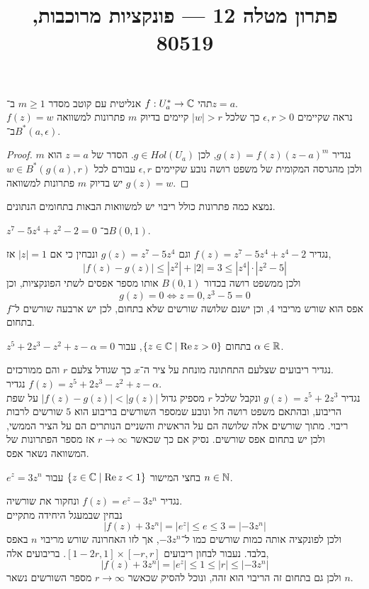 
\title{פתרון מטלה 12 --- פונקציות מרוכבות, 80519}


\maketitle
\maketitleprint{}

\question{}
תהי $f : U_a^* \to \mathbb{C}$ אנליטית עם קוטב מסדר $m \ge 1$ ב־$z = a$. \\
נראה שקיימים $\epsilon, r > 0$ כך שלכל $|w| > r$ קיימים בדיוק $m$ פתרונות למשוואה $f(z) = w$ ב־$B^*(a, \epsilon)$.
\begin{proof}
	נגדיר $g(z) = f(z) {(z - a)}^m$, לכן $g \in Hol(U_a)$.
	הסדר של $z = a$ הוא $m$ ולכן מהגרסה המקומית של משפט רושה נובע שקיימים $\epsilon, r$ עבורם לכל $w \in B^*(g(a), r)$ יש בדיוק $m$ פתרונות למשוואה $g(z) = w$.
\end{proof}

\question{}
נמצא כמה פתרונות כולל ריבוי יש למשוואות הבאות בתחומים הנתונים.

\subquestion{}
$z^7 - 5z^4 + z^2 - 2 = 0$ ב־$B(0, 1)$.
\begin{solution}
	נגדיר $f(z) = z^7 - 5z^4 + z^4 - 2$ וגם $g(z) = z^7 - 5z^4$ ונבחין כי אם $|z| = 1$ אז,
	\[
		|f(z) - g(z)|
		\le |z^2| + |2|
		= 3
		\le |z^4| \cdot |z^2 - 5|
	\]
	ולכן ממשפט רושה בכדור $B(0, 1)$ אותו מספר אפסים לשתי הפונקציות, וכן
	\[
		g(z) = 0
		\iff z = 0, z^3 - 5 = 0
	\]
	אפס הוא שורש מריבוי 4, וכן ישנם שלושה שורשים שלא בתחום, לכן יש ארבעה שורשים ל־$f$ בתחום.
\end{solution}

\subquestion{}
$z^5 + 2z^3 - z^2 + z - \alpha = 0$ בתחום $\{ z \in \mathbb{C} \mid \operatorname{Re} z > 0 \}$, עבור $\alpha \in \mathbb{R}$.
\begin{solution}
	נגדיר ריבועים שצלעם התחתונה מונחת על ציר ה־$x$ כך שגודל צלעם $r$ והם ממורכזים. \\
	נגדיר $f(z) = z^5 + 2z^3 - z^2 + z - \alpha$. \\
	נגדיר $g(z) = z^5 + 2z^3$ ונקבל שלכל $r$ מספיק גדול $|f(z) - g(z)| < |g(z)|$ על שפת הריבוע, ובהתאם משפט רושה חל ונובע שמספר השורשים בריבוע הוא $5$ שורשים לרבות ריבוי.
	מתוך שורשים אלה שלושה הם על הראשית והשניים הנותרים הם על הציר הממשי, ולכן יש בתחום אפס שורשים.
	נסיק אם כך שכאשר $r \to \infty$ אז מספר הפתרונות של המשוואה נשאר אפס.
\end{solution}

\subquestion{}
$e^z = 3z^n$ בחצי המישור $\{ z \in \mathbb{C} \mid \operatorname{Re} z < 1 \}$ עבור $n \in \mathbb{N}$.
\begin{solution}
	נגדיר $f(z) = e^z - 3z^n$ ונחקור את שורשיה. \\
	נבחין שבמעגל היחידה מתקיים
	\[
		|f(z) + 3z^n|
		= |e^z|
		\le e
		\le 3
		= |-3z^n|
	\]
	ולכן לפונקציה אותה כמות שורשים כמו ל־$-3z^n$, אך לזו האחרונה שורש מריבוי $n$ באפס בלבד.
	נעבור לבחון ריבועים $[1 - 2r, 1] \times [-r, r]$.
	בריבועים אלה,
	\[
		|f(z) + 3z^n|
		= |e^z|
		\le 1
		\le |r|
		\le |-3z^n|
	\]
	ולכן גם בתחום זה הריבוי הוא זהה, ונוכל להסיק שכאשר $r \to \infty$ מספר השורשים נשאר $n$.
\end{solution}

